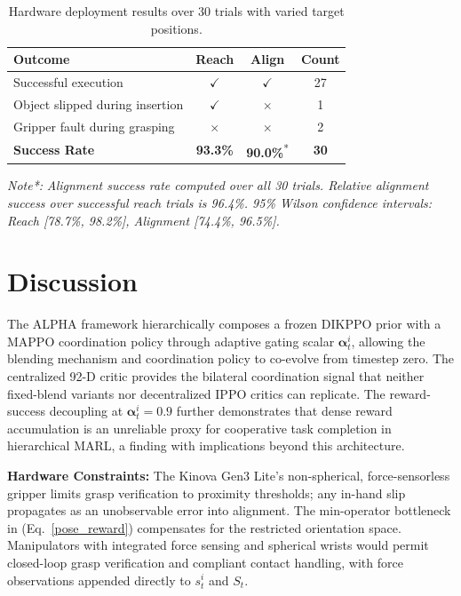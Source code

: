 \documentclass[a4paper,fleqn]{cas-dc}
\begin{document}
\begin{table}[t]
\caption{Hardware deployment results over 30 trials with varied target positions.}
\label{hardware_result}
\centering
\footnotesize
\setlength{\tabcolsep}{4pt}
\renewcommand{\arraystretch}{1.2}
\begin{tabular}{l c c c}
\toprule
\textbf{Outcome} & \textbf{Reach} & \textbf{Align} & \textbf{Count} \\
\midrule
Successful execution            & $\checkmark$ & $\checkmark$ & 27 \\
Object slipped during insertion & $\checkmark$ & $\times$     & 1  \\
Gripper fault during grasping   & $\times$     & $\times$     & 2  \\
\midrule
\textbf{Success Rate} & \textbf{93.3\%} & \textbf{90.0\%}\textsuperscript{*} & \textbf{30} \\
\bottomrule
\end{tabular}

\vspace{2pt}
\footnotesize{\textit{Note*:}} \textit{Alignment success rate computed over all 30 trials. Relative alignment success over successful reach trials is 96.4\%. 95\% Wilson confidence intervals: Reach [78.7\%, 98.2\%], Alignment [74.4\%, 96.5\%].}
\end{table}

\section{Discussion}
\label{discussion}
The ALPHA framework hierarchically composes a frozen DIKPPO prior with a MAPPO coordination policy through adaptive gating scalar $\mathbf{\alpha}^{i}_{t}$, allowing the blending mechanism and coordination policy to co-evolve from timestep zero. The centralized 92-D critic provides the bilateral coordination signal that neither fixed-blend variants nor decentralized IPPO critics can replicate. The reward-success decoupling at $\mathbf{\alpha}^{i}_{t}=0.9$ further demonstrates that dense reward accumulation is an unreliable proxy for cooperative task completion in hierarchical MARL, a finding with implications beyond this architecture.

\noindent\textbf{Hardware Constraints:} The Kinova Gen3 Lite's non-spherical, force-sensorless gripper limits grasp verification to proximity thresholds; any in-hand slip propagates as an unobservable error into alignment. The min-operator bottleneck in (Eq.~\ref{pose_reward}) compensates for the restricted orientation space. Manipulators with integrated force sensing and spherical wrists would permit closed-loop grasp verification and compliant contact handling, with force observations appended directly to $s^i_{t}$ and $S_t$.
\end{document}
